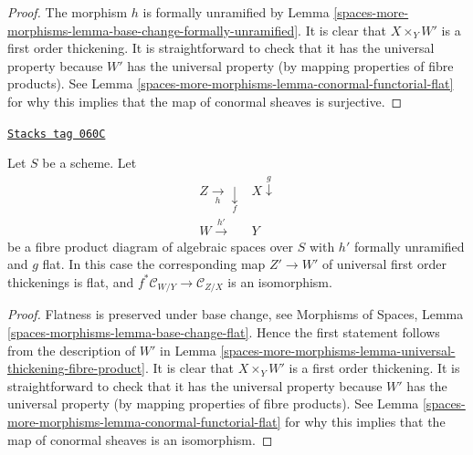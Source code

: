 \begin{proof}
The morphism $h$ is formally unramified by
Lemma \ref{spaces-more-morphisms-lemma-base-change-formally-unramified}.
It is clear that $X \times_Y W'$ is a first order thickening.
It is straightforward to check that it has the universal property
because $W'$ has the universal property (by mapping properties of
fibre products). See
Lemma \ref{spaces-more-morphisms-lemma-conormal-functorial-flat}
for why this implies that the map of conormal sheaves is surjective.
\end{proof}

\begin{lemma}
\label{spaces-more-morphisms-lemma-universal-thickening-fibre-product-flat}
\href{https://stacks.math.columbia.edu/tag/060C}{\texttt{Stacks tag 060C}}

Let $S$ be a scheme. Let
$$
\begin{array}{cc}Z \underset{h}{\longrightarrow}\underset{f}{\downarrow} & X \overset{g}{\downarrow} \\ W \overset{h'}{\longrightarrow} & Y\end{array}
$$
be a fibre product diagram of algebraic spaces over $S$ with
$h'$ formally unramified and $g$ flat. In this case the corresponding
map $Z' \to W'$ of universal first order thickenings is flat, and
$f^*\mathcal{C}_{W/Y} \to \mathcal{C}_{Z/X}$ is an isomorphism.
\end{lemma}

\begin{proof}
Flatness is preserved under base change, see
Morphisms of Spaces, Lemma \ref{spaces-morphisms-lemma-base-change-flat}.
Hence the first statement follows from the description of $W'$ in
Lemma \ref{spaces-more-morphisms-lemma-universal-thickening-fibre-product}.
It is clear that $X \times_Y W'$ is a first order thickening.
It is straightforward to check that it has the universal property
because $W'$ has the universal property (by mapping properties of
fibre products). See
Lemma \ref{spaces-more-morphisms-lemma-conormal-functorial-flat}
for why this implies that the map of conormal sheaves is an isomorphism.
\end{proof}

